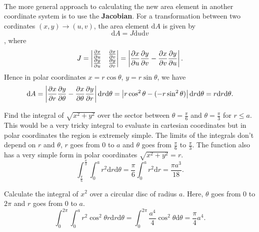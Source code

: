 \documentclass[../multivariate_calculus.tex]{subfiles}
\begin{document}
        \paragraph{}
        The more general approach to calculating the new area element in another coordinate system is to use the \textbf{Jacobian}.
        For a transformation between two cordinates $(x,y)\to(u,v)$, the area element $\mathrm{d}A$ is given by
        \begin{equation}
            \mathrm{d}A=J\mathrm{d}u\mathrm{d}v
        \end{equation},
        where
        \begin{equation}
            J=\begin{vmatrix}
                \frac{\partial x}{\partial u} & \frac{\partial x}{\partial v} \\
                \frac{\partial y}{\partial u} & \frac{\partial y}{\partial v}
            \end{vmatrix}=\left|\frac{\partial x}{\partial u}\frac{\partial y}{\partial v}-\frac{\partial x}{\partial v}\frac{\partial y}{\partial u}\right|.
        \end{equation}
        Hence in polar coordinates $x=r\cos\theta$, $y=r\sin\theta$, we have
        \begin{equation}
            \mathrm{d}A=\left|\frac{\partial x}{\partial r}\frac{\partial y}{\partial\theta}-\frac{\partial x}{\partial\theta}\frac{\partial y}{\partial r}\right|\mathrm{d}r\mathrm{d}\theta=\left|r\cos^2\theta-(-r\sin^2\theta)\right|\mathrm{d}r\mathrm{d}\theta=r\mathrm{d}r\mathrm{d}\theta.
        \end{equation}
        \begin{example}
            Find the integral of $\sqrt{x^2+y^2}$ over the sector between $\theta=\frac{\pi}{6}$ and $\theta=\frac{\pi}{3}$ for $r\leq a$.
            This would be a very tricky integral to evaluate in cartesian coordinates but in polar coordinates the region is extremely simple.
            The limits of the integrals don't depend on $r$ and $\theta$, $r$ goes from 0 to $a$ and $\theta$ goes from $\frac{\pi}{6}$ to $\frac{\pi}{3}$.
            The function also has a very simple form in polar coordinates $\sqrt{x^2+y^2}=r$.
            \begin{equation}
                \int_\frac{\pi}{6}^\frac{\pi}{3}\int_0^a r^2\mathrm{d}r\mathrm{d}\theta=\frac{\pi}{6}\int_0^a r^2\mathrm{d}r=\frac{\pi a^3}{18}.
            \end{equation}
        \end{example}
        \begin{example}
            Calculate the integral of $x^2$ over a circular disc of radius $a$.
            Here, $\theta$ goes from 0 to $2\pi$ and $r$ goes from 0 to $a$.
            \begin{equation}
                \int_0^{2\pi}\int_0^a r^2\cos^2\theta r\mathrm{d}r\mathrm{d}\theta=\int_0^{2\pi}\frac{a^4}{4}\cos^2\theta\mathrm{d}\theta=\frac{\pi}{4}a^4.
            \end{equation}
        \end{example}
\end{document}
